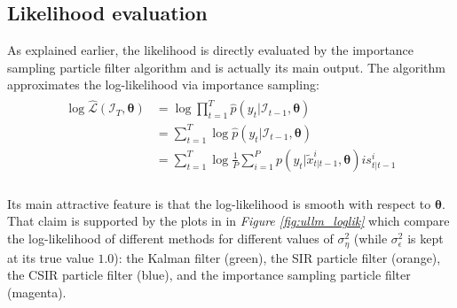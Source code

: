 \documentclass[11pt, oneside]{scrreprt}   	%
\begin{document}
\subsection{Likelihood evaluation}
As explained earlier, the likelihood is directly evaluated by the importance sampling particle filter algorithm and is actually its main output. 
The algorithm approximates the log-likelihood via importance sampling:
\begin{align*} 
\begin{split}
\log \hat{\mathcal{L}}(\mathcal{I}_T, \boldsymbol{\theta}) &= \log \prod_{t=1}^T \hat{p}(y_t | \mathcal{I}_{t-1}, \boldsymbol{\theta}) \\
&= \sum_{t=1}^T \log \hat{p}(y_t | \mathcal{I}_{t-1}, \boldsymbol{\theta}) \\
&= \sum_{t=1}^T \log \frac{1}{P} \sum_{i=1}^P p(y_t | \tilde{x}_{t|t-1}^i, \boldsymbol{\theta}) is_{t|t-1}^i \\
\end{split}					
\end{align*} 
 
Its main attractive feature is that the log-likelihood is smooth with respect to $\boldsymbol{\theta}$. 
That claim is supported by the plots in in \textit{Figure \ref{fig:ullm_loglik}} which compare the log-likelihood of different methods for different values of $\sigma_{\eta}^2$ (while $\sigma_{\epsilon}^2$ is kept at its true value $1.0$): the Kalman filter (green), the SIR particle filter (orange), the CSIR particle filter (blue), and the importance sampling particle filter (magenta).\\ 
\end{document}
